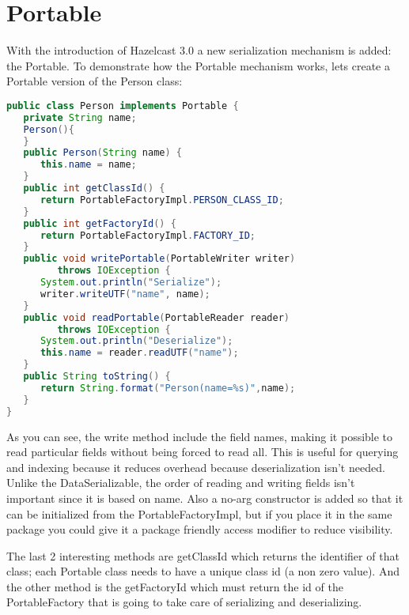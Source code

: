 \section{Portable}
With the introduction of Hazelcast 3.0 a new serialization mechanism is added: the Portable. To demonstrate how the Portable mechanism works, lets create a Portable version of the Person class:
\begin{lstlisting}[language=java]
public class Person implements Portable {
   private String name;
   Person(){
   }
   public Person(String name) {
      this.name = name;
   }
   public int getClassId() {
      return PortableFactoryImpl.PERSON_CLASS_ID;
   }
   public int getFactoryId() {
      return PortableFactoryImpl.FACTORY_ID;
   }
   public void writePortable(PortableWriter writer) 
         throws IOException {
      System.out.println("Serialize");
      writer.writeUTF("name", name);
   }
   public void readPortable(PortableReader reader) 
         throws IOException {
      System.out.println("Deserialize");
      this.name = reader.readUTF("name");
   }
   public String toString() {
      return String.format("Person(name=%s)",name);
   }
}
\end{lstlisting}
As you can see, the write method include the field names, making it possible to read particular fields without being forced to read all. This is useful for querying and indexing because it reduces overhead because deserialization isn't needed. Unlike the DataSerializable, the order of reading and writing fields isn't important since it is based on name. Also a no-arg constructor is added so that it can be initialized from the PortableFactoryImpl, but if you place it in the same package you could give it a package friendly access modifier to reduce visibility. 

The last 2 interesting methods are getClassId which returns the identifier of that class; each Portable class needs to have a unique class id (a non zero value). And the other method is the getFactoryId which must return the id of the PortableFactory that is going to take care of serializing and deserializing.

